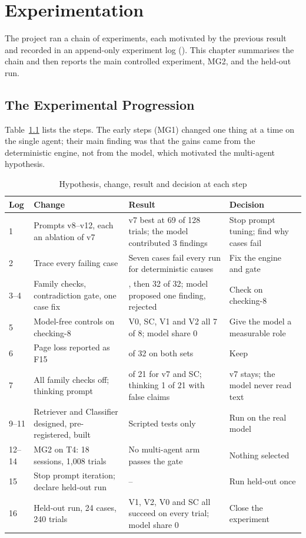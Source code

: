 \chapter{Experimentation}
The project ran a chain of experiments, each motivated by the previous result and recorded in an
append-only experiment log (). This chapter
summarises the chain and then reports the main controlled experiment, MG2, and the held-out run.

\section{The Experimental Progression}
Table~\ref{tab:progression} lists the steps. The early steps (MG1) changed one thing at a time on the
single agent; their main finding was that the gains came from the deterministic engine, not from the
model, which motivated the multi-agent hypothesis.

\begin{table}[htbp]
\centering
\caption{Hypothesis, change, result and decision at each step}
\label{tab:progression}
\small
\begin{tabularx}{\linewidth}{@{}l >{\raggedright\arraybackslash}X >{\raggedright\arraybackslash}X >{\raggedright\arraybackslash}X@{}}
\toprule
\textbf{Log} & \textbf{Change} & \textbf{Result} & \textbf{Decision} \\ \midrule
1 & Prompts v8--v12, each an ablation of v7 & v7 best at 69 of 128 trials; the model contributed 3 findings & Stop prompt tuning; find why cases fail \\
2 & Trace every failing case & Seven cases fail every run for deterministic causes & Fix the engine and gate \\
3--4 & Family checks, contradiction gate, one case fix & 30, then 32 of 32; model proposed one finding, rejected & Check on checking-8 \\
5 & Model-free controls on checking-8 & V0, SC, V1 and V2 all 7 of 8; model share 0 & Give the model a measurable role \\
6 & Page loss reported as F15 & 32 of 32 on both sets & Keep \\
7 & All family checks off; thinking prompt & 0 of 21 for v7 and SC; thinking 1 of 21 with false claims & v7 stays; the model never read text \\
9--11 & Retriever and Classifier designed, pre-registered, built & Scripted tests only & Run on the real model \\
12--14 & MG2 on T4: 18 sessions, 1{,}008 trials & No multi-agent arm passes the gate & Nothing selected \\
15 & Stop prompt iteration; declare held-out run & -- & Run held-out once \\
16 & Held-out run, 24 cases, 240 trials & V1, V2, V0 and SC all succeed on every trial; model share 0 & Close the experiment \\
\bottomrule
\end{tabularx}
\end{table}

